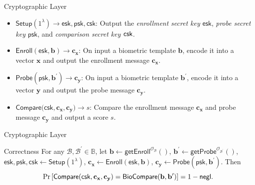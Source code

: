 \begin{frame}{Cryptographic Layer}

\pause
\begin{itemize}

	\item $\textsf{Setup}(1^\lambda) \to \textsf{esk}, \textsf{psk}, \textsf{csk}$: Output the \emph{enrollment secret key $\textsf{esk}$}, \emph{probe secret key $\textsf{psk}$}, and \emph{comparison secret key $\sf csk$}.
	\pause

	\item $\textsf{Enroll}(\textsf{esk}, \mathbf{b}) \to \mathbf{c_x}$: On input a biometric template $\mathbf{b}$, encode it into a vector $\mathbf{x}$ and output the enrollment message $\mathbf{c_x}$.
	\pause

	\item $\textsf{Probe}(\textsf{psk}, \mathbf{b}^\prime) \to \mathbf{c_y}$: On input a biometric template $\mathbf{b}^\prime$, encode it into a vector $\mathbf{y}$ and output the probe message $\mathbf{c_y}$.
	\pause

	\item $\textsf{Compare}(\textsf{csk}, \mathbf{c_x}, \mathbf{c_y)} \to s$: Compare the enrollment message $\mathbf{c_x}$ and probe message $\mathbf{c_y}$ and output a score $s$.

\end{itemize}

\end{frame}


\begin{frame}{Cryptographic Layer}

\begin{block}{Correctness} 
For any $\mathcal{B}, \mathcal{B}^\prime \in \mathbb{B}$, \pause
let $\mathbf{b} \gets \textsf{getEnroll}^{\mathcal{O}_\mathcal{B}}()$, $\mathbf{b}^\prime \gets \textsf{getProbe}^{\mathcal{O}_{\mathcal{B}^\prime}}()$, \pause
$\textsf{esk}, \textsf{psk}, \textsf{csk} \gets \textsf{Setup}(1^\lambda)$,
$\mathbf{c_x} \gets \textsf{Enroll}(\textsf{esk}, \mathbf{b})$,
$\mathbf{c_y} \gets \textsf{Probe}(\textsf{psk}, \mathbf{b}^\prime)$.
\pause
Then
	\[
		\Pr \left [
			\textsf{Compare}(\textsf{csk}, \mathbf{c_x}, \mathbf{c_y}) = \textsf{BioCompare}(\mathbf{b}, \mathbf{b}^\prime)
		\right ] = 1 - \mathsf{negl}.
	\]
\end{block}

\end{frame}






